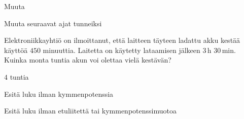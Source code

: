 \begin{tehtavasivu}

\begin{tehtava}
Muuta
  \begin{vastaus}
  \end{vastaus}
\end{tehtava}

\begin{tehtava}
Muuta seuraavat ajat tunneiksi
	\begin{vastaus}
	\end{vastaus}
\end{tehtava}


\begin{tehtava}
Elektroniikkayhtiö on ilmoittanut, että laitteen täyteen ladattu akku kestää käyttöä $450$ minuuttia. Laitetta on käytetty lataamisen jälkeen $3$\,h $30$\,min. Kuinka monta tuntia akun voi olettaa vielä kestävän?
\begin{vastaus}
$4$ tuntia
\end{vastaus}
\end{tehtava}

\begin{tehtava}
Esitä luku ilman kymmenpotenssia
\begin{vastaus}
\end{vastaus}
\end{tehtava}


\begin{tehtava}
Esitä luku ilman etuliitettä tai kymmenpotenssimuotoa
\begin{vastaus}
\end{vastaus}
\end{tehtava}


\end{tehtavasivu}
